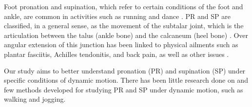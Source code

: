 Foot pronation and supination, which refer to certain conditions of the foot and ankle, are common in activities such as running and dance \parencite{willems}.
PR and SP are classified, in a general sense, as the movement of the subtalar joint, which is the articulation between the talus (ankle bone) and the calcaneum (heel bone) \parencite{griffiths}.
Over angular extension of this junction has been linked to physical ailments such as plantar fasciitis, Achilles tendonitis, and back pain, as well as other issues \parencite{willems}.\par
Our study aims to better understand pronation (PR) and supination (SP) under specific conditions of dynamic motion.
There has been little research done on and few methods developed for studying PR and SP under dynamic motion, such as walking and jogging.
